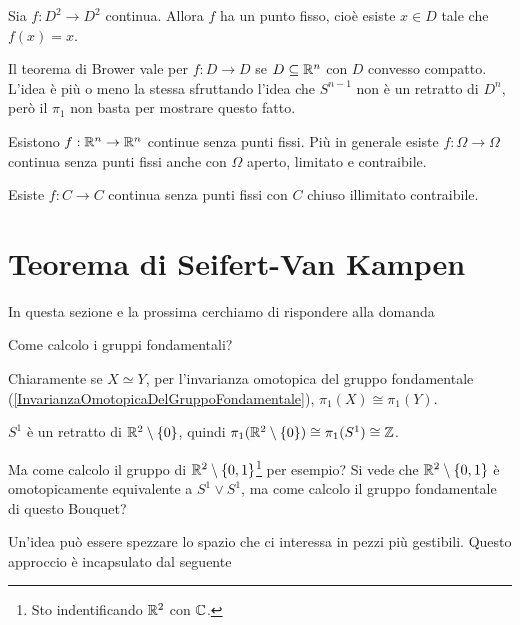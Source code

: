 \begin{multicols*}{2}
\begin{theorem}\label{TeoremaBrower}
Sia $f:D^2\to D^2$ continua. Allora $f$ ha un punto fisso, cioè esiste $x\in D$ tale che $f(x)=x$.
\end{theorem}

\begin{remark}
Il teorema di Brower vale per $f:D\to D$ se $D\subseteq \mathbb{R}^n$ con $D$ convesso compatto. L'idea è più o meno la stessa sfruttando l'idea che $S^{n-1}$ non è un retratto di $D^n$, però il $\pi_1$ non basta per mostrare questo fatto.
\end{remark}

\begin{remark}
Esistono $f:\mathbb{R}^n\to \mathbb{R}^n$ continue senza punti fissi. Più in generale esiste $f:\Omega\to\Omega$ continua senza punti fissi anche con $\Omega$ aperto, limitato e contraibile.
\bigskip

\noindent
Esiste $f:C\to C$ continua senza punti fissi con $C$ chiuso illimitato contraibile.
\end{remark}

\section{Teorema di Seifert-Van Kampen}
In questa sezione e la prossima cerchiamo di rispondere alla domanda
\begin{center}
Come calcolo i gruppi fondamentali?
\end{center}
Chiaramente se $X\simeq Y$, per l'invarianza omotopica del gruppo fondamentale (\ref{InvarianzaOmotopicaDelGruppoFondamentale}), $\pi_1(X)\cong \pi_1(Y)$.

\begin{example}
$S^1$ è un retratto di $\mathbb{R}^2\setminus\{0\}$, quindi $\pi_1(\mathbb{R}^2\setminus\{0\})\cong \pi_1(S^1)\cong \mathbb{Z}$.
\end{example}

\noindent Ma come calcolo il gruppo di $\mathbb{R}^2\setminus\{0,1\}$\footnote{Sto indentificando $\mathbb{R}^2$ con $\mathbb{C}$.} per esempio?  Si vede che $\mathbb{R}^2\setminus\{0,1\}$ è omotopicamente equivalente a $S^1\vee S^1$, ma come calcolo il gruppo fondamentale di questo Bouquet?
\medskip

\noindent
Un'idea pu\`o essere spezzare lo spazio che ci interessa in pezzi pi\`u gestibili. Questo approccio \`e incapsulato dal seguente



\end{multicols*}
